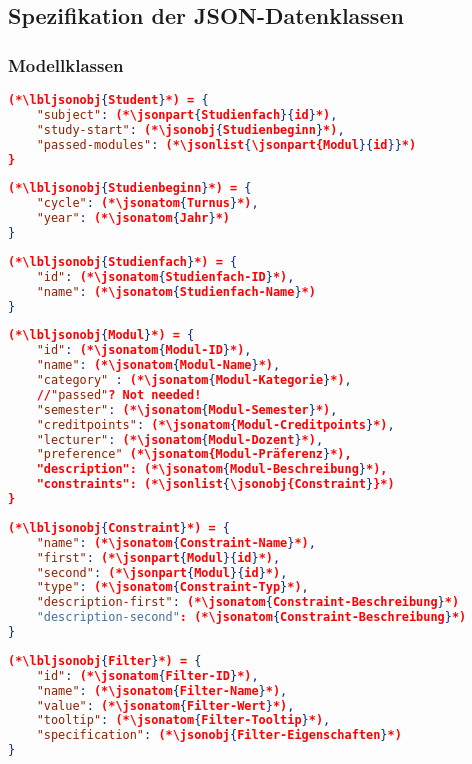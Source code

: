 \FloatBarrier
\subsection{Spezifikation der JSON-Datenklassen}

\subsubsection*{Modellklassen}

\begin{lstlisting}[language=json]
(*\lbljsonobj{Student}*) = {
	"subject": (*\jsonpart{Studienfach}{id}*),
	"study-start": (*\jsonobj{Studienbeginn}*),
	"passed-modules": (*\jsonlist{\jsonpart{Modul}{id}}*)
}
\end{lstlisting}

\begin{lstlisting}[language=json]
(*\lbljsonobj{Studienbeginn}*) = {
	"cycle": (*\jsonatom{Turnus}*),
	"year": (*\jsonatom{Jahr}*)
}
\end{lstlisting}

\begin{lstlisting}[language=json]	
(*\lbljsonobj{Studienfach}*) = {
	"id": (*\jsonatom{Studienfach-ID}*),
	"name": (*\jsonatom{Studienfach-Name}*)
}
\end{lstlisting}


\begin{lstlisting}[language=json]
(*\lbljsonobj{Modul}*) = {
	"id": (*\jsonatom{Modul-ID}*),
	"name": (*\jsonatom{Modul-Name}*),
	"category" : (*\jsonatom{Modul-Kategorie}*),
	//"passed"? Not needed!
	"semester": (*\jsonatom{Modul-Semester}*),
	"creditpoints": (*\jsonatom{Modul-Creditpoints}*),
	"lecturer": (*\jsonatom{Modul-Dozent}*),
	"preference" (*\jsonatom{Modul-Präferenz}*),
	"description": (*\jsonatom{Modul-Beschreibung}*),	
	"constraints": (*\jsonlist{\jsonobj{Constraint}}*)
}
\end{lstlisting}

\begin{lstlisting}[language=json]
(*\lbljsonobj{Constraint}*) = {
	"name": (*\jsonatom{Constraint-Name}*),
	"first": (*\jsonpart{Modul}{id}*),
	"second": (*\jsonpart{Modul}{id}*),
	"type": (*\jsonatom{Constraint-Typ}*),
	"description-first": (*\jsonatom{Constraint-Beschreibung}*)
	"description-second": (*\jsonatom{Constraint-Beschreibung}*)	
}
\end{lstlisting}

\begin{lstlisting}[language=json]
(*\lbljsonobj{Filter}*) = {
	"id": (*\jsonatom{Filter-ID}*),
	"name": (*\jsonatom{Filter-Name}*),
	"value": (*\jsonatom{Filter-Wert}*),
	"tooltip": (*\jsonatom{Filter-Tooltip}*),
	"specification": (*\jsonobj{Filter-Eigenschaften}*)
}
\end{lstlisting}

